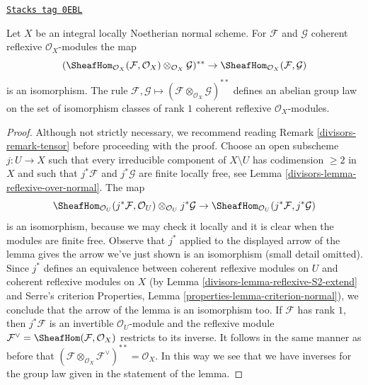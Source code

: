 \begin{lemma}
\label{divisors-lemma-reflexive-normal}
\href{https://stacks.math.columbia.edu/tag/0EBL}{\texttt{Stacks tag 0EBL}}

Let $X$ be an integral locally Noetherian normal scheme.
For $\mathcal{F}$ and $\mathcal{G}$ coherent reflexive
$\mathcal{O}_X$-modules the map
$$
(\SheafHom_{\mathcal{O}_X}(\mathcal{F}, \mathcal{O}_X)
\otimes_{\mathcal{O}_X} \mathcal{G})^{**} \to
\SheafHom_{\mathcal{O}_X}(\mathcal{F}, \mathcal{G})
$$
is an isomorphism. The rule $\mathcal{F}, \mathcal{G} \mapsto
(\mathcal{F} \otimes_{\mathcal{O}_X} \mathcal{G})^{**}$
defines an abelian group law on the set of isomorphism classes of rank $1$
coherent reflexive $\mathcal{O}_X$-modules.
\end{lemma}

\begin{proof}

Although not strictly necessary, we recommend reading
Remark \ref{divisors-remark-tensor} before proceeding with the proof.
Choose an open subscheme $j : U \to X$ such that
every irreducible component of $X \setminus U$ has codimension $\geq 2$
in $X$ and such that $j^*\mathcal{F}$ and $j^*\mathcal{G}$ are finite
locally free, see Lemma \ref{divisors-lemma-reflexive-over-normal}.
The map
$$
\SheafHom_{\mathcal{O}_U}(j^*\mathcal{F}, \mathcal{O}_U)
\otimes_{\mathcal{O}_U} j^*\mathcal{G} \to
\SheafHom_{\mathcal{O}_U}(j^*\mathcal{F}, j^*\mathcal{G})
$$
is an isomorphism, because we may check it locally and it is
clear when the modules are finite free. Observe that $j^*$
applied to the displayed arrow of the lemma gives the arrow
we've just shown is an isomorphism (small detail omitted).
Since $j^*$ defines an equivalence between coherent reflexive modules on $U$
and coherent reflexive modules on $X$
(by Lemma \ref{divisors-lemma-reflexive-S2-extend} and Serre's criterion
Properties, Lemma \ref{properties-lemma-criterion-normal}),
we conclude that the arrow of the lemma is an isomorphism too.
If $\mathcal{F}$ has rank $1$, then $j^*\mathcal{F}$
is an invertible $\mathcal{O}_U$-module and the reflexive module
$\mathcal{F}^\vee = \SheafHom(\mathcal{F}, \mathcal{O}_X)$
restricts to its inverse. It follows in the same manner as before that
$(\mathcal{F} \otimes_{\mathcal{O}_X} \mathcal{F}^\vee)^{**} = \mathcal{O}_X$.
In this way we see that we have inverses for the group law
given in the statement of the lemma.
\end{proof}

